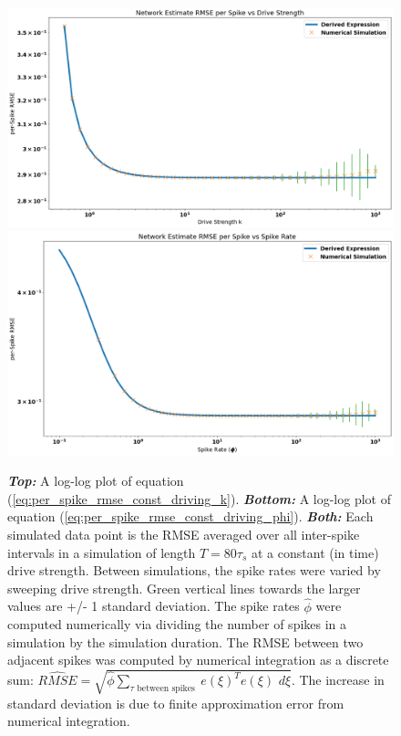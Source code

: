 \begin{enumerate}
\begin{figure}[h]
\includegraphics[width=\linewidth]{figures/rmse_sp_vs_k_const_driving.png}
\centering
\includegraphics[width=\linewidth]{figures/rmse_sp_vs_phi_const_driving.png}
\caption{\textbf{\textit{Top:}} A log-log plot of equation (\ref{eq:per_spike_rmse_const_driving_k}). \textbf{\textit{Bottom:}} A log-log plot of equation (\ref{eq:per_spike_rmse_const_driving_phi}). \textbf{\textit{Both:}} Each simulated data point is the RMSE averaged over all inter-spike intervals in a simulation of length $T = 80 \tau_s$ at a constant (in time) drive strength. Between simulations, the spike rates were varied by sweeping drive strength. Green vertical lines towards the larger values are +/- 1 standard deviation. The spike rates $\hat{\phi}$ were computed numerically via dividing the number of spikes in a simulation by the simulation duration. The RMSE between two adjacent spikes was computed by numerical integration as a discrete sum: $\hat{RMSE} = \sqrt{\hat{\phi} \sum_{\tau \text{ between spikes }} e(\xi)^T e(\xi) \, \, d\xi }$. The increase in standard deviation is due to finite approximation error from numerical integration.}
\label{fig:const_driving_per_spike_rmse_vs_phi_k}
\end{figure}
\end{enumerate}
